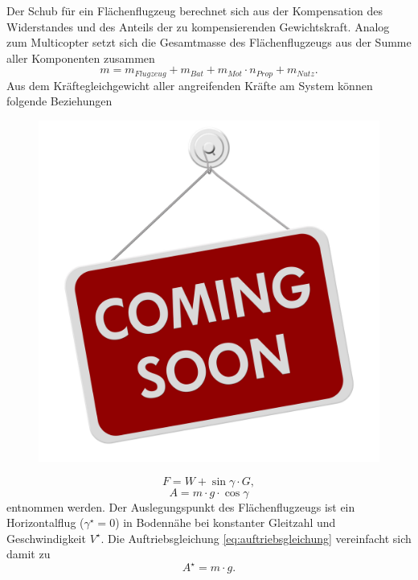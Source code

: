 Der Schub für ein Flächenflugzeug berechnet sich aus der Kompensation des Widerstandes und des Anteils der zu kompensierenden Gewichtskraft. Analog zum Multicopter setzt sich die Gesamtmasse des Flächenflugzeugs aus der Summe aller Komponenten zusammen
\begin{equation}
	m = m_{Flugzeug}+m_{Bat}+m_{Mot}\cdot n_{Prop}+m_{Nutz}.
\end{equation}
Aus dem Kräftegleichgewicht aller angreifenden Kräfte am System können folgende Beziehungen 
\begin{figure}[H]
	\centering
	\includegraphics[scale=0.2]{images/Coming-Soon.jpg}
\end{figure}
\begin{equation}
	F = W + \sin\gamma\cdot G, \label{eq:widerstandsgleichung}
\end{equation}
\begin{equation}
	A = m\cdot g\cdot\cos\gamma 
\end{equation} \label{eq:auftriebsgleichung}
entnommen werden. Der Auslegungspunkt des Flächenflugzeugs ist ein Horizontalflug (\ensuremath{\gamma^\star = 0}) in Bodennähe bei konstanter Gleitzahl und Geschwindigkeit \ensuremath{V^\star}. Die Auftriebsgleichung \ref{eq:auftriebsgleichung} vereinfacht sich damit zu
\begin{equation}
	A^\star = m\cdot g .
\end{equation}
